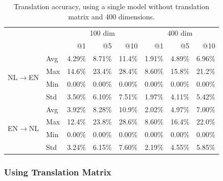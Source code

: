 \begin{table}[ht!]
	\centering
	\label{table:results_single_model_no_matrix}
	\begin{tabular}{ll|r|r|r|r|r|r|}
	\cline{3-8}
												 		&		& \multicolumn{3}{|c|}{100 dim}  		& \multicolumn{3}{c|}{400 dim} 	 \\ \cline{3-8} 
                  										&		& @1 		& @5 		& @10 	 		& @1 		& @5 		& @10 	 \\ \hline
    \multicolumn{1}{|l|}{\multirow{4}{*}{NL$\to$EN}}	& Avg	& 4.29\%	& 8.71\%	& 11.4\%		& 1.91\%	& 4.89\%	& 6.96\% \\ \cline{2-8} 
    \multicolumn{1}{|l|}{}								& Max	& 14.6\%	& 23.4\%	& 28.4\%		& 8.60\%	& 15.8\%	& 21.2\% \\ \cline{2-8} 
    \multicolumn{1}{|l|}{}								& Min	& 0.00\%	& 0.00\%	& 0.00\%		& 0.00\%	& 0.00\%	& 0.00\% \\ \cline{2-8} 
    \multicolumn{1}{|l|}{}								& Std	& 3.50\%	& 6.10\%	& 7.51\%		& 1.97\%	& 4.11\%	& 5.42\% \\ \hline
    \multicolumn{1}{|l|}{\multirow{4}{*}{EN$\to$NL}}	& Avg	& 3.92\%	& 8.28\%	& 10.9\%		& 2.02\%	& 4.97\%	& 7.00\% \\ \cline{2-8} 
    \multicolumn{1}{|l|}{}								& Max	& 12.4\%	& 23.8\%	& 28.6\%		& 8.60\%	& 16.4\%	& 22.0\% \\ \cline{2-8} 
    \multicolumn{1}{|l|}{}								& Min	& 0.00\%	& 0.00\%	& 0.00\%		& 0.00\%	& 0.00\%	& 0.00\% \\ \cline{2-8} 
    \multicolumn{1}{|l|}{}								& Std	& 3.24\%	& 6.15\%	& 7.60\%		& 2.19\%	& 4.55\%	& 5.85\% \\ \hline
	\end{tabular}
	\caption{Translation accuracy, using a single model without translation matrix and 400 dimensions.}
\end{table}

\subsubsection{Using Translation Matrix}
